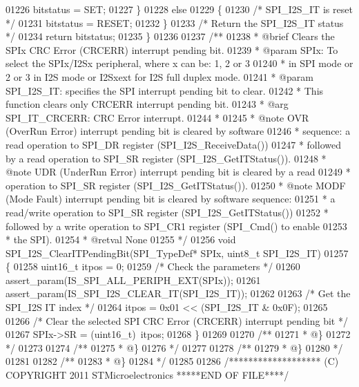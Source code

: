 \begin{DoxyCode}
01226     bitstatus = SET;
01227   \}
01228   \textcolor{keywordflow}{else}
01229   \{
01230     \textcolor{comment}{/* SPI\_I2S\_IT is reset */}
01231     bitstatus = RESET;
01232   \}
01233   \textcolor{comment}{/* Return the SPI\_I2S\_IT status */}
01234   \textcolor{keywordflow}{return} bitstatus;
01235 \}
01236 
01237 \textcolor{comment}{/**}
01238 \textcolor{comment}{  * @brief  Clears the SPIx CRC Error (CRCERR) interrupt pending bit.}
01239 \textcolor{comment}{  * @param  SPIx: To select the SPIx/I2Sx peripheral, where x can be: 1, 2 or 3 }
01240 \textcolor{comment}{  *         in SPI mode or 2 or 3 in I2S mode or I2Sxext for I2S full duplex mode.  }
01241 \textcolor{comment}{  * @param  SPI\_I2S\_IT: specifies the SPI interrupt pending bit to clear.}
01242 \textcolor{comment}{  *         This function clears only CRCERR interrupt pending bit.   }
01243 \textcolor{comment}{  *            @arg SPI\_IT\_CRCERR: CRC Error interrupt.}
01244 \textcolor{comment}{  *   }
01245 \textcolor{comment}{  * @note   OVR (OverRun Error) interrupt pending bit is cleared by software }
01246 \textcolor{comment}{  *          sequence: a read operation to SPI\_DR register (SPI\_I2S\_ReceiveData()) }
01247 \textcolor{comment}{  *          followed by a read operation to SPI\_SR register (SPI\_I2S\_GetITStatus()).}
01248 \textcolor{comment}{  * @note   UDR (UnderRun Error) interrupt pending bit is cleared by a read }
01249 \textcolor{comment}{  *          operation to SPI\_SR register (SPI\_I2S\_GetITStatus()).   }
01250 \textcolor{comment}{  * @note   MODF (Mode Fault) interrupt pending bit is cleared by software sequence:}
01251 \textcolor{comment}{  *          a read/write operation to SPI\_SR register (SPI\_I2S\_GetITStatus()) }
01252 \textcolor{comment}{  *          followed by a write operation to SPI\_CR1 register (SPI\_Cmd() to enable }
01253 \textcolor{comment}{  *          the SPI).}
01254 \textcolor{comment}{  * @retval None}
01255 \textcolor{comment}{  */}
01256 \textcolor{keywordtype}{void} SPI_I2S_ClearITPendingBit(SPI\_TypeDef* SPIx, uint8\_t SPI\_I2S\_IT)
01257 \{
01258   uint16\_t itpos = 0;
01259   \textcolor{comment}{/* Check the parameters */}
01260   assert_param(IS\_SPI\_ALL\_PERIPH\_EXT(SPIx));
01261   assert_param(IS\_SPI\_I2S\_CLEAR\_IT(SPI\_I2S\_IT));
01262 
01263   \textcolor{comment}{/* Get the SPI\_I2S IT index */}
01264   itpos = 0x01 << (SPI\_I2S\_IT & 0x0F);
01265 
01266   \textcolor{comment}{/* Clear the selected SPI CRC Error (CRCERR) interrupt pending bit */}
01267   SPIx->SR = (uint16\_t)~itpos;
01268 \}
01269 
01270 \textcolor{comment}{/**}
01271 \textcolor{comment}{  * @\}}
01272 \textcolor{comment}{  */}
01273 
01274 \textcolor{comment}{/**}
01275 \textcolor{comment}{  * @\}}
01276 \textcolor{comment}{  */}
01277 
01278 \textcolor{comment}{/**}
01279 \textcolor{comment}{  * @\}}
01280 \textcolor{comment}{  */}
01281 
01282 \textcolor{comment}{/**}
01283 \textcolor{comment}{  * @\}}
01284 \textcolor{comment}{  */}
01285 
01286 \textcolor{comment}{/******************* (C) COPYRIGHT 2011 STMicroelectronics *****END OF FILE****/}
\end{DoxyCode}
